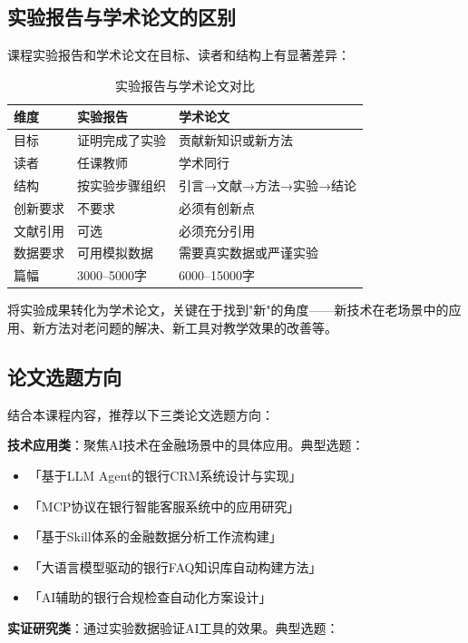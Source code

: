 \subsection{实验报告与学术论文的区别}

课程实验报告和学术论文在目标、读者和结构上有显著差异：

\begin{table}[H]
\centering
\begin{tabular}{lll}
\toprule
\textbf{维度} & \textbf{实验报告} & \textbf{学术论文} \\
\midrule
目标 & 证明完成了实验 & 贡献新知识或新方法 \\
读者 & 任课教师 & 学术同行 \\
结构 & 按实验步骤组织 & 引言→文献→方法→实验→结论 \\
创新要求 & 不要求 & 必须有创新点 \\
文献引用 & 可选 & 必须充分引用 \\
数据要求 & 可用模拟数据 & 需要真实数据或严谨实验 \\
篇幅 & 3000--5000字 & 6000--15000字 \\
\bottomrule
\end{tabular}
\caption{实验报告与学术论文对比}
\end{table}

将实验成果转化为学术论文，关键在于找到"新"的角度——新技术在老场景中的应用、新方法对老问题的解决、新工具对教学效果的改善等。

\subsection{论文选题方向}

结合本课程内容，推荐以下三类论文选题方向：

\textbf{技术应用类}：聚焦AI技术在金融场景中的具体应用。典型选题：

\begin{itemize}[leftmargin=2em]
  \item 「基于LLM Agent的银行CRM系统设计与实现」
  \item 「MCP协议在银行智能客服系统中的应用研究」
  \item 「基于Skill体系的金融数据分析工作流构建」
  \item 「大语言模型驱动的银行FAQ知识库自动构建方法」
  \item 「AI辅助的银行合规检查自动化方案设计」
\end{itemize}

\textbf{实证研究类}：通过实验数据验证AI工具的效果。典型选题：

